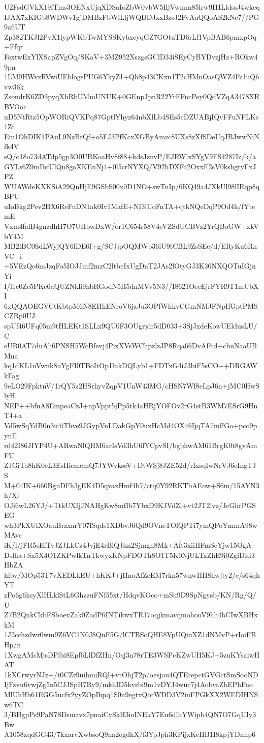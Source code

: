 U2FsdGVkX19fTms3OENxUjqXDSaIoZbW0vbW5IljVwmm85lrw9I1ILldssJ4wkeq
IJAX7xKIGb8WDWv1gjDMBzFbWlLljWQDDJxxBzsJ2FvAuQQoAS2kNc7//PG9a6UT
Zp382TKJl2PvX1lypWKbTwMYSSKybxeyqGZ7GOtuTD6rLf1VpBAB6pmxpOq+Ffqr
FsxtwExYlXSapZVgOq/SKaV+3MZ952XszgsGClD34iSEyCyBYDvzjHz+ROkw49pn
1LM9HWvzRVwiUEblogsPUG6YkyZ1+Qh8p43CKxn1T2cHMnOasQWZ4Fz1uQ6vw36k
ZsondrK6ZD3pyqXhRbUMmUNUK+0GEnpJpnR22YrFFncPey0QdVZqA3478XRBVOoc
uD5NtRtz5OpWORiQVKPq87GptlYhyz64nbXlLb4SEs5cDZUABjIQvFFuNFLKs1Zt
Em1OhDIK4PAuL9NzBrQf+o5FJ3PfKcxXGByAmzc8UXs8zXfSDeUqJBJwwNiNfk4V
sQ/o18o73dATdp5gp3O0URKoaHv8f88+kdsJznvP/EJRWlxSYgV9FS4287Iz/k/a
GYLs6Z9mIbrUlQn8goXKEnNj4+0l5crNYXQ/V92hDXFa2OxxE2sV0ksbgtyFxJPZ
WUAWdeKXKSiA29QnHjE9GSbS00x0D1NO+swTnIp/6KQ49a4JXkUl98lIRqp8qBPU
uIoBkg2Pev2HX6ReFuDN1ak0Iv1MafE+NI3lUoFnTA+qtkNQeDqP9Od4h/fYtemE
Vxm4falB4gnzdhH7O7UHbwDxW/or1C654r58V4eVZSdUCBVz2YrQBoGW+xkVbY4M
MB2lBC0SdLWyjQY6fDE6f+g/SCJjpOQMWb36iU9tCBL9ZsSEe/d/ERyKu6RnVC+i
+5VEzQo6mJzqFo5IOJJmf2mzC2ltbeIxUgDnT2JAs2lOtyGJ3K30NXQOTuIGjnYi
I/l1c0Zc5PKc6aQUZNkli9hbRGodN5H5dnMVv5N3//I8621OecEjrFYR9T1mUbXI
6xQQAOEGVCtKbtpM6N8EHhENroV6jaJu3OPfWhkvCGmNMJFNpIfGptPMSCZRp0UJ
spUf46UFq05m9tHLEKt1SLLx9QU0F3OUgrjdr5dD033+3SjJxdeKowUEldusLU/C
eUR0AT7duAh6PNSH5WcBfevj4PixXVsWChpzlzJP8Rqa66DvAFcd+cbuNaaUBMua
kq1dKL1nVwnk8uYgFI0TBoItOp1lukDQLyb1+FDTxG4iJ3biF5sCO++DRGAWkFag
9eLO29FpktnV/1rQY5z2HSrhyvZqpV1UnW43MG/cHSN7Wf8eLpJ6n+jMC0HwSlyH
NEP++bfuA8EmpeaCzJ+npVppt5jPp5tk4aHRjYOFOv2rG4stB3WM7ESrG9HnT4+a
Vd5wSqYdB0n3u4iThve9JGypVnLDakGpY0uxHcMd4OX46IjqTA7mFGo+pco9pynE
rd42I86JIYP4U+ARwaNlQHM6arIsVd3hU6fYCpvSI/bgbhwAM61BrgK0t8gvAmFU
ZJGiTu8hK0eL3EsHiememQ7JYWvkseV+DtWSj8JZE52d/rIxsqIwNrVJ6eIngTJS
M+04IK+660BguDFh3gEK4D5qvaxHmf4b7/ctq0Y92RKTbAEow+S6m/15AYN3h/Xj
OJi6wL26YJ/+TtkUXIjJNAHgKw8mfIb7YbxD9KJVdZl+vt2JT2lvz/JcGhrPGSEG
wh3PkXUlXOauBrzxarY07fSqds1XDbvJ6Qd9OVneTOlQPTi7ymQPoYmmA98wMAvc
iK/l/jFR5sEfTvJZJLkCz4JvjE4rBiQJhn2Sjmgh8Mk+Aft3xiiHFmSeYjw15OgA
Dslha+Sx5X4O1ZKPwlkTnTkwyxKNpFDOTh8O1T5K0NjULTxZhE9i0ZgfDId3HbZA
hlbv/MOp53T7vXEDLkEU+hKKJ+jHnoAfZeEM7rkn57wnwHH8hwjty2/e/s64qhYT
zPo6g6ksyXlHLklStL6GhzzuFNf55xt/HdqvKOco+mSu9D9SpNgysb/KN/Rg/Q/U
Z7B2QnkCkbFSboexZak0ZadP6INTikwxTR17oqjkmavqmohonV9hh4bCIwXBHxkM
1J2cchzdwr0wm9Z6VC1N0J8QnF5G/lCTBSoQHE8VpUQiuXZ1dNMvP+rIoiFBHp/n
1XwgAMsMjsDPlbi8Epf6LlDfZHn/Osj3n78rTE3WSPcKZwUH5KJ+5zuKYsaiwHAT
1kXCrwyrNJz+/t0CZr9uihmiRQl+vtOhjT2p/oesjou4QTErepctGVGctSmSooND
IjFzvu6vwjZg5n5CJJSpH7Ry9/mkhID5kvrbi9m1vDYJ4wuc7j4AobvaZbEPhFno
MlUhHb61EGG5ucfx2yyZOpIbpq1S0n9egtxQorWDD3V2iuFPGkXX2WEDIHNSw6TC
3/BHgpPs9PaN7SDsmavx7pnaiCySkH3ioINEkY7Eu6dlhYWipb4QN7O7GqUIy3Bw
A1058xqdGG43/7kxarvXwbsoQ9na2ogdkX/f3YpJph3KPijxKeHB1I8kpjYDnhp6
